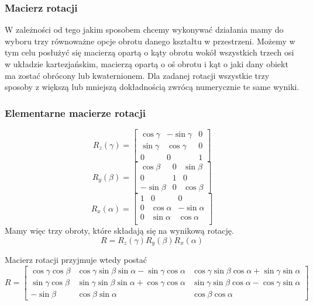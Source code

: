 \documentclass{article}
\begin{document}
\subsubsection*{\Large{Macierz rotacji}}
W zależności od tego jakim sposobem chcemy wykonywać działania mamy do wyboru trzy równoważne opcje obrotu danego kształtu w przestrzeni. Możemy w tym celu posłużyć się macierzą opartą o kąty obrotu wokół wszystkich trzech osi w układzie kartezjańskim, macierzą opartą o oś obrotu i kąt o jaki dany obiekt ma zostać obrócony lub kwaternionem. Dla zadanej rotacji wszystkie trzy sposoby z większą lub mniejszą dokładnością zwrócą numerycznie te same wyniki.

\subsubsection*{\Large{Elementarne macierze rotacji}}
\[
R_{z}(\gamma) = \begin{bmatrix}
\cos \gamma & -\sin \gamma & 0 \\
\sin \gamma & \cos \gamma & 0 \\
0 & 0 & 1
\end{bmatrix}
\]
\[
R_{y}(\beta) = \begin{bmatrix}
\cos \beta & 0 & \sin \beta \\
0 & 1 & 0 \\
-\sin \beta & 0 & \cos \beta
\end{bmatrix}
\]
\[
R_{x}(\alpha) = \begin{bmatrix}
1 & 0 & 0 \\
0 & \cos \alpha & -\sin \alpha \\
0 & \sin \alpha & \cos \alpha \\
\end{bmatrix}
\]
Mamy więc trzy obroty, które składają się na wynikową rotację.
\[R = R_{z}(\gamma)R_{y}(\beta)R_{x}(\alpha)\]

Macierz rotacji przyjmuje wtedy postać
\[
R = \begin{bmatrix}
\cos \gamma \cos \beta & 
\cos \gamma \sin \beta \sin \alpha - \sin \gamma \cos \alpha &
\cos \gamma \sin \beta \cos \alpha + \sin \gamma \sin \alpha \\
\sin \gamma \cos \beta &
\sin \gamma \sin \beta \sin \alpha + \cos \gamma \cos \alpha &
\sin \gamma \sin \beta \cos \alpha - \cos \gamma \sin \alpha \\
-\sin \beta & \cos \beta \sin \alpha & \cos \beta \cos \alpha
\end{bmatrix}
\]
\end{document}
